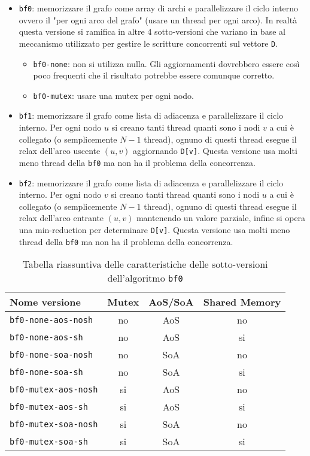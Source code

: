 \documentclass[a4paper]{article}
\begin{document}
	\begin{itemize}
		\item \texttt{bf0}: memorizzare il grafo come array di archi e parallelizzare il ciclo interno ovvero il "per ogni arco del grafo" (usare un thread per ogni arco). In realtà questa versione si ramifica in altre 4 sotto-versioni che variano in base al meccanismo utilizzato per gestire le scritture concorrenti sul vettore \texttt{D}.
		\begin{itemize}
			\item \texttt{bf0-none}: non si utilizza nulla. Gli aggiornamenti dovrebbero essere così poco frequenti che il risultato potrebbe essere comunque corretto.
			\item \texttt{bf0-mutex}: usare una mutex per ogni nodo.
		\end{itemize}
	
		\item \texttt{bf1}: memorizzare il grafo come lista di adiacenza e parallelizzare il ciclo interno. Per ogni nodo $u$ si creano tanti thread quanti sono i nodi $v$ a cui è collegato (o semplicemente $N-1$ thread), ognuno di questi thread esegue il relax dell'arco uscente $(u,v)$ aggiornando \texttt{D[v]}. Questa versione usa molti meno thread della \texttt{bf0} ma non ha il problema della concorrenza.
		
		\item \texttt{bf2}: memorizzare il grafo come lista di adiacenza e parallelizzare il ciclo interno. Per ogni nodo $v$ si creano tanti thread quanti sono i nodi $u$ a cui è collegato (o semplicemente $N-1$ thread), ognuno di questi thread esegue il relax dell'arco entrante $(u,v)$ mantenendo un valore parziale, infine si opera una min-reduction per determinare \texttt{D[v]}. Questa versione usa molti meno thread della \texttt{bf0} ma non ha il problema della concorrenza.
	\end{itemize}
	
	\begin{table}[!ht]
		\centering
		\begin{tabular}{|l|c|c|c|}
			\hline
			\textbf{Nome versione} & \textbf{Mutex} & \textbf{AoS/SoA} & \textbf{Shared Memory} \\ \hline
			\texttt{bf0-none-aos-nosh}  & no & AoS & no \\ \hline
			\texttt{bf0-none-aos-sh}    & no & AoS & si \\ \hline
			\texttt{bf0-none-soa-nosh}  & no & SoA & no \\ \hline
			\texttt{bf0-none-soa-sh}    & no & SoA & si \\ \hline
			\texttt{bf0-mutex-aos-nosh} & si & AoS & no \\ \hline
			\texttt{bf0-mutex-aos-sh}   & si & AoS & si \\ \hline
			\texttt{bf0-mutex-soa-nosh} & si & SoA & no \\ \hline
			\texttt{bf0-mutex-soa-sh}   & si & SoA & si \\ \hline
		\end{tabular}
		\label{tab:riassunto_bf0}
		\caption{Tabella riassuntiva delle caratteristiche delle sotto-versioni dell'algoritmo \texttt{bf0}}
	\end{table}
\end{document}
